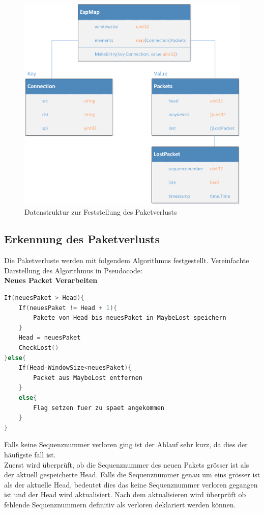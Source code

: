 \begin{figure}[H]
    \begin{center}
        \includegraphics[trim=1 0 0 0,clip,width=\textwidth]{start/img/Datenstruktur.png}
    \end{center}
    \caption{Datenstruktur zur Feststellung des Paketverlusts}
\end{figure}
\clearpage
\subsection{Erkennung des Paketverlusts}
Die Paketverluste werden mit folgendem Algorithmus festgestellt. 
Vereinfachte Darstellung des Algorithmus in Pseudocode:\\
\textbf{Neues Packet Verarbeiten}
\begin{lstlisting}[language=go]
If(neuesPaket > Head){
	If(neuesPaket != Head + 1){
		Pakete von Head bis neuesPaket in MaybeLost speichern
	}
	Head = neuesPaket
	CheckLost()
}else{
	If(Head-WindowSize<neuesPaket){
		Packet aus MaybeLost entfernen
	}
	else{
		Flag setzen fuer zu spaet angekommen
	}
}
\end{lstlisting}
Falls keine Sequenznummer verloren ging ist der Ablauf sehr kurz, da dies der häufigste fall ist.\\
Zuerst wird überprüft, ob die Sequenznummer des neuen Pakets grösser ist als der aktuell gespeicherte Head. Falls die Sequenznummer genau um eins grösser ist als der aktuelle Head, bedeutet dies das keine Sequenznummer verloren gegangen ist und der Head wird aktualisiert.
Nach dem aktualisieren wird überprüft ob fehlende Sequenznummern definitiv als verloren deklariert werden können.\\

